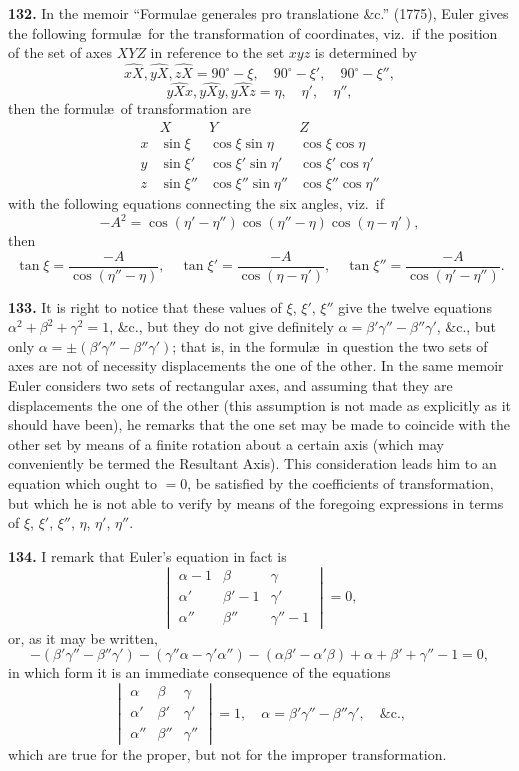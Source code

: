 \documentclass[11pt,a4paper]{article}
\theoremstyle{definition}
\begin{document}
\textbf{132.} In the memoir ``Formulae generales pro translatione \&c.'' (1775), Euler gives the following formul\ae\ for the transformation of coordinates, viz.\ if the position of the set of axes $XYZ$ in reference to the set $xyz$ is determined by
\[
\widehat{xX}, \widehat{yX}, \widehat{zX} = 90^\circ - \xi, \quad 90^\circ - \xi', \quad 90^\circ - \xi'',
\]
\[
\widehat{yXx}, \widehat{yXy}, \widehat{yXz} = \eta, \quad \eta', \quad \eta'',
\]
then the formul\ae\ of transformation are
\[
\begin{array}{c|ccc}
& X & Y & Z \\ \hline
x & \sin\xi & \cos\xi\sin\eta & \cos\xi\cos\eta \\
y & \sin\xi' & \cos\xi'\sin\eta' & \cos\xi'\cos\eta' \\
z & \sin\xi'' & \cos\xi''\sin\eta'' & \cos\xi''\cos\eta''
\end{array}
\]
with the following equations connecting the six angles, viz.\ if
\[
-A^2 = \cos(\eta' - \eta'')\cos(\eta'' - \eta)\cos(\eta - \eta'),
\]
then
\[
\tan\xi = \frac{-A}{\cos(\eta'' - \eta)}, \quad
\tan\xi' = \frac{-A}{\cos(\eta - \eta')}, \quad
\tan\xi'' = \frac{-A}{\cos(\eta' - \eta'')}.
\]

\textbf{133.} It is right to notice that these values of $\xi$, $\xi'$, $\xi''$ give the twelve equations $\alpha^2 + \beta^2 + \gamma^2 = 1$, \&c., but they do not give definitely $\alpha = \beta'\gamma'' - \beta''\gamma'$, \&c., but only $\alpha = \pm(\beta'\gamma'' - \beta''\gamma')$; that is, in the formul\ae\ in question the two sets of axes are not of necessity displacements the one of the other. In the same memoir Euler considers two sets of rectangular axes, and assuming that they are displacements the one of the other (this assumption is not made as explicitly as it should have been), he remarks that the one set may be made to coincide with the other set by means of a finite rotation about a certain axis (which may conveniently be termed the Resultant Axis). This consideration leads him to an equation which ought to $= 0$, be satisfied by the coefficients of transformation, but which he is not able to verify by means of the foregoing expressions in terms of $\xi$, $\xi'$, $\xi''$, $\eta$, $\eta'$, $\eta''$.

\textbf{134.} I remark that Euler's equation in fact is
\[
\begin{vmatrix}
\alpha - 1 & \beta & \gamma \\
\alpha' & \beta' - 1 & \gamma' \\
\alpha'' & \beta'' & \gamma'' - 1
\end{vmatrix} = 0,
\]
or, as it may be written,
\[
-(\beta'\gamma'' - \beta''\gamma') - (\gamma''\alpha - \gamma'\alpha'') - (\alpha\beta' - \alpha'\beta) + \alpha + \beta' + \gamma'' - 1 = 0,
\]
in which form it is an immediate consequence of the equations
\[
\begin{vmatrix}
\alpha & \beta & \gamma \\
\alpha' & \beta' & \gamma' \\
\alpha'' & \beta'' & \gamma''
\end{vmatrix} = 1, \quad \alpha = \beta'\gamma'' - \beta''\gamma', \quad \&\text{c.},
\]
which are true for the proper, but not for the improper transformation.
\end{document}
